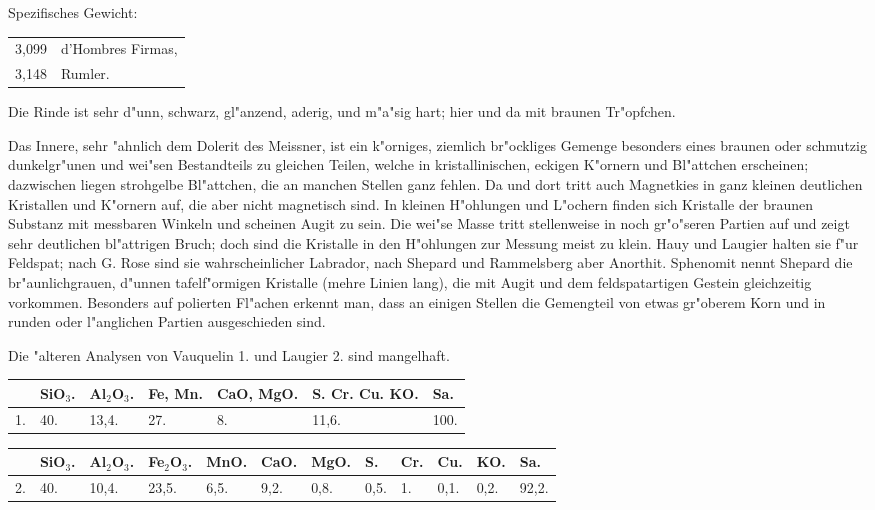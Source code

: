 \documentclass[a4paper, 11pt, oneside]{article}
\begin{document}
Spezifisches Gewicht:
\begin{table}[!ht]
    \centering\swabfamily\Large
    \begin{tabular}{l l}
        3,099 & d'Hombres Firmas,\\
        3,148 & Rumler.
    \end{tabular}
\end{table}

Die Rinde ist sehr d"unn, schwarz, gl"anzend, aderig, und m"a"sig hart; hier und da mit braunen Tr"opfchen.

Das Innere, sehr "ahnlich dem Dolerit des Meissner, ist ein k"orniges, ziemlich br"ockliges Gemenge besonders eines braunen oder schmutzig dunkelgr"unen und wei"sen Bestandteils zu gleichen Teilen, welche in kristallinischen, eckigen K"ornern und Bl"attchen erscheinen; dazwischen liegen strohgelbe Bl"attchen, die an manchen Stellen ganz fehlen. Da und dort tritt auch Magnetkies in ganz kleinen deutlichen Kristallen und K"ornern auf, die aber nicht magnetisch sind. In kleinen H"ohlungen und L"ochern finden sich Kristalle der braunen Substanz mit messbaren Winkeln und scheinen Augit zu sein. Die wei"se Masse tritt stellenweise in noch gr"o"seren Partien auf und zeigt sehr deutlichen bl"attrigen Bruch; doch sind die Kristalle in den H"ohlungen zur Messung meist zu klein. Hauy und Laugier halten sie f"ur Feldspat; nach G. Rose sind sie wahrscheinlicher Labrador, nach Shepard und Rammelsberg aber Anorthit. Sphenomit nennt Shepard die br"aunlichgrauen, d"unnen tafelf"ormigen Kristalle (mehre Linien lang), die mit Augit und dem feldspatartigen Gestein gleichzeitig vorkommen. Besonders auf polierten Fl"achen erkennt man, dass an einigen Stellen die Gemengteil von etwas gr"oberem Korn und in runden oder l"anglichen Partien ausgeschieden sind.

Die "alteren Analysen von Vauquelin 1. und Laugier 2. sind mangelhaft.
\begin{table}[!ht]
    \centering\swabfamily\Large
    \normalsize
    \begin{tabular}{p{3mm} p{6mm} p{6mm} p{10mm} p{20mm} p{20mm} p{6mm}}
         & SiO$_{3}$. & Al$_{2}$O$_{3}$. & Fe, Mn. & CaO, MgO. & S. Cr. Cu. KO. & Sa. \\ \hline
        1. & 40. & 13,4. & 27. & 8. & 11,6. & 100. \\
    \end{tabular}
\end{table}

\begin{table}[!ht]
    \centering\swabfamily\Large
    \normalsize
    \begin{tabular}{p{3mm} p{6mm} p{6mm} p{6mm} p{6mm} p{6mm} p{6mm} p{6mm} p{6mm} p{6mm} p{6mm} p{6mm}}
         & SiO$_{3}$. & Al$_{2}$O$_{3}$. & Fe$_{2}$O$_{3}$. & MnO. & CaO. & MgO. & S. & Cr. & Cu. & KO. & Sa. \\ \hline
        2. & 40. & 10,4. & 23,5. & 6,5. & 9,2. & 0,8. & 0,5. & 1. & 0,1. & 0,2. & 92,2. \\
    \end{tabular}
\end{table}
\end{document}
